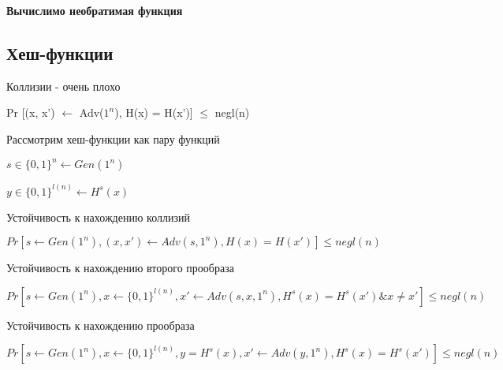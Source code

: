 \documentclass{article}
\begin{document}
\textbf{Вычислимо необратимая функция}

\subsection{Хеш-функции}

Коллизии - очень плохо

Pr [(x, x') $\leftarrow$ Adv($1^n$), H(x) = H(x')] $\leq$ negl(n)

Рассмотрим хеш-функции как пару функций

$s \in \{0,1\}^n \leftarrow Gen(1^n)$

$y \in \{0,1\}^{l(n)} \leftarrow H^s(x)$

Устойчивость к нахождению коллизий

$Pr[s \leftarrow Gen(1^n), (x, x') \leftarrow Adv(s, 1^n), H(x) = H(x')] \leq negl(n)$

Устойчивость к нахождению второго прообраза

$Pr[s \leftarrow Gen(1^n), x \leftarrow \{0, 1\}^{l(n)}, x' \leftarrow Adv(s, x, 1^n), H^s(x) = H^s(x') \& x \neq x'] \leq negl(n)$

Устойчивость к нахождению прообраза

$Pr[s \leftarrow Gen(1^n), x \leftarrow \{0, 1\}^{l(n)}, y = H^s(x), x' \leftarrow Adv(y, 1^n), H^s(x) = H^s(x')] \leq negl(n)$
\end{document}
